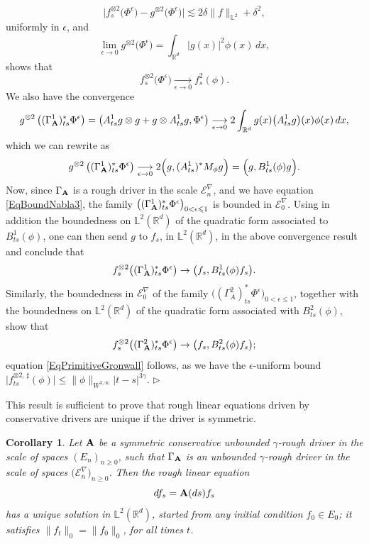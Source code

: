 \documentclass[11pt,a4paper]{amsart}
\newcommand{\RR}{\mathbb{R}}  \newcommand{\CC}{\mathbb{C}}  \newcommand{\LL}{\mathbb{L}}  \newcommand{\WW}{\mathbb{W}}
\newcommand{\mcE}{\mathcal{E}}
\renewcommand{\leq}{\leqslant}
\renewcommand{\geq}{\geqslant}
\newtheorem{cor}[thm]{\hspace{-0.15cm}  {\sc Corollary} }%
\numberwithin{equation}{section} %
\newenvironment{Dem}{%
    \begin{list}{\hspace{0.5cm}{\sc Proof --}}{%
        \setlength{\topsep}{0pt}%
        \setlength{\leftmargin}{0pt}%
        \setlength{\rightmargin}{0pt}%
        \setlength{\listparindent}{0pt}%
        \setlength{\itemindent}{0pt}%
        \setlength{\parsep}{0pt}%
        \addtolength{\leftmargin}{20pt}%
        \addtolength{\rightmargin}{0pt}%
    } \item }{\hfill{\space $\rhd$}\end{list}\smallskip}
\begin{document}
\begin{Dem}
$$ 
\Big|f^{\otimes 2}_s \big(\Phi^\epsilon\big)- g^{\otimes 2} \big(\Phi^\epsilon\big) \Big| \lesssim 2\delta \|f\|_{\LL^2} + \delta^2,
$$ 
uniformly in $\epsilon$, and
$$
\lim_{\epsilon\to 0} g^{\otimes 2} \big(\Phi^\epsilon) = \int_{\RR^d }\big|g(x)\big|^2 \phi (x)\,dx,
$$
shows that 
$$
f^{\otimes 2}_s \big(\Phi^\epsilon\big) \underset{\epsilon\to 0}{\longrightarrow} f_s^2(\phi). 
$$
We also have the convergence 
$$
g^{\otimes 2} \left((\Gamma_{\bfA}^1)^*_{ts} \Phi^\epsilon\right) = \big( A^1_{ts} g \otimes g + g \otimes A^1_{ts} g, \Phi^\epsilon \big) \underset{\epsilon\to 0}{\longrightarrow} 2 \int_{\RR^d } g(x) \big(A^1_{ts}g\big)(x) \phi (x)\, dx,
$$
which we can rewrite as
$$
g^{\otimes 2} \left((\Gamma_{\bf A}^1)^*_{ts} \Phi^\epsilon\right) \underset{\epsilon\to 0}{\longrightarrow} 2\Big( g , (A^1_{ts})^* M_\phi g \Big) = \Big(g,B^1_{ts}(\phi)g\Big).
$$
Now, since $\Gamma_{\bf A}$ is a rough driver in the scale $\mcE^\nabla_n$, and we have equation \eqref{EqBoundNabla3}, the family $\big((\Gamma_{\bfA}^1)^*_{ts} \Phi^\epsilon\big)_{0<\epsilon\leq 1}$ is bounded in $\mcE^\nabla_0$. Using in addition the boundedness on $\LL^2(\RR^d)$ of the quadratic form associated to $B^1_{ts}(\phi)$, one can then send $g$ to $f_s$, in $\LL^2(\RR^d)$, in the above convergence result and conclude that
$$
f^{\otimes 2}_s \big((\Gamma_{\bf A}^1)_{ts}^*\Phi^\epsilon\big) \to \big( f_s , B^1_{ts}(\phi) f_s\big). 
$$
Similarly, the boundedness in $\mcE^\nabla_0$ of the family $\big((\Gamma_A^2)^*_{ts} \Phi^\epsilon\big)_{0<\epsilon\leq 1}$, together with the boundedness on $\LL^2(\RR^d)$ of the quadratic form associated with $B^2_{ts}(\phi)$, show that 
$$
f^{\otimes 2}_s \big((\Gamma_{\bf A}^2)_{ts}^*\Phi^\epsilon\big) \to \big( f_s , B^2_{ts}(\phi) f_s\big);
$$
equation \eqref{EqPrimitiveGronwall} follows, as we have the $\epsilon$-uniform bound $\Big|f^{\otimes 2,\,\sharp}_{ts}(\phi)\Big| \leq \big\|\phi\big\|_{W^{3,\infty}}|t-s|^{3\gamma}$.  
\end{Dem} 

\bigskip

This result is sufficient to prove that rough linear equations driven by conservative drivers are unique if the driver is symmetric. 

\begin{cor}
\label{CorClosedSymmCons}
Let $\bf A$ be a symmetric conservative unbounded $\gamma$-rough driver in the scale of spaces $(E_n)_{n\geq 0}$, such that $\Gamma_{\bf A}$ is an unbounded $\gamma$-rough driver in the scale of spaces $\big(\mcE^\nabla_n\big)_{n\geq 0}$. Then the rough linear equation
$$
df_s = {\bf A}(ds)f_s
$$
has a unique solution in $\LL^2(\RR^d)$, started from any initial condition $f_0\in E_0$; it satisfies $\big\|f_t\big\|_0 = \big\|f_0\big\|_0$, for all times $t$.
\end{cor}
\end{document}
